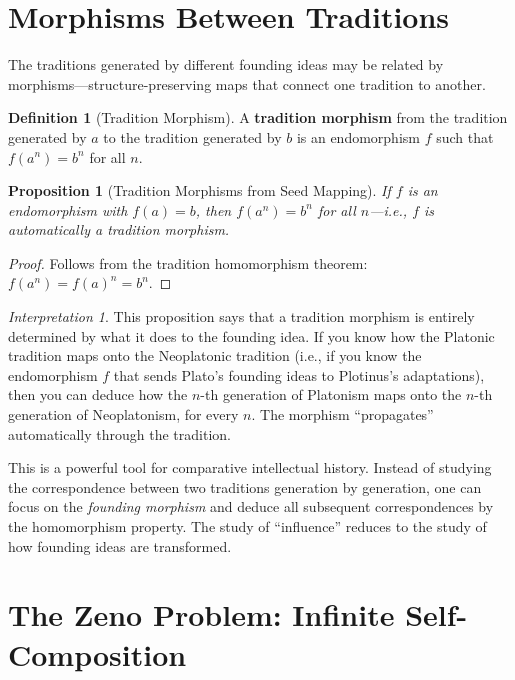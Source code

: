 \documentclass[11pt,openany]{book}
\theoremstyle{definition}
\newtheorem{definition}[axiom]{Definition}
\theoremstyle{plain}
\newtheorem{proposition}[axiom]{Proposition}
\theoremstyle{remark}
\newtheorem{interpretation}[axiom]{Interpretation}
\begin{document}
\section{Morphisms Between Traditions}

The traditions generated by different founding ideas may be related by morphisms---structure-preserving maps that connect one tradition to another.

\begin{definition}[Tradition Morphism]
A \textbf{tradition morphism} from the tradition generated by $a$ to the tradition generated by $b$ is an endomorphism $f$ such that $f(a^n) = b^n$ for all $n$.
\end{definition}

\begin{proposition}[Tradition Morphisms from Seed Mapping]
If $f$ is an endomorphism with $f(a) = b$, then $f(a^n) = b^n$ for all $n$---i.e., $f$ is automatically a tradition morphism.
\end{proposition}

\begin{proof}
Follows from the tradition homomorphism theorem: $f(a^n) = f(a)^n = b^n$.
\end{proof}

\begin{interpretation}
This proposition says that a tradition morphism is entirely determined by what it does to the founding idea. If you know how the Platonic tradition maps onto the Neoplatonic tradition (i.e., if you know the endomorphism $f$ that sends Plato's founding ideas to Plotinus's adaptations), then you can deduce how the $n$-th generation of Platonism maps onto the $n$-th generation of Neoplatonism, for every $n$. The morphism ``propagates'' automatically through the tradition.

This is a powerful tool for comparative intellectual history. Instead of studying the correspondence between two traditions generation by generation, one can focus on the \emph{founding morphism} and deduce all subsequent correspondences by the homomorphism property. The study of ``influence'' reduces to the study of how founding ideas are transformed.
\end{interpretation}

\section{The Zeno Problem: Infinite Self-Composition}
\end{document}
